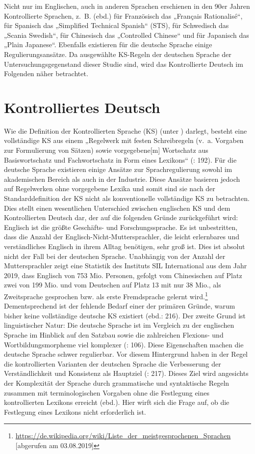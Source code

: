 Nicht nur im Englischen, auch in anderen Sprachen erschienen in den 90er Jahren Kontrollierte Sprachen, z.~B. (ebd.) für Französisch das „Français Rationalisé“, für Spanisch das „Simplified Technical Spanish“ (STS), für Schwedisch das „Scania Swedish“, für Chinesisch das „Controlled Chinese“ und für Japanisch das „Plain Japanese“. Ebenfalls existieren für die deutsche Sprache einige Regulierungsansätze. Da ausgewählte KS-Regeln der deutschen Sprache der Untersuchungsgegenstand dieser Studie sind, wird das Kontrollierte Deutsch im Folgenden näher betrachtet.

\section{\label{sec:2.3}Kontrolliertes Deutsch}

Wie die Definition der Kontrollierten Sprache (KS) (unter ) darlegt, besteht eine vollständige KS aus einem „Regelwerk mit festen Schreibregeln (v.~a. Vorgaben zur Formulierung von Sätzen) sowie vorgegebene[m] Wortschatz aus Basiswortschatz und Fachwortschatz in Form eines Lexikons“ (\citealt{DrewerZiegler2014}: 192). Für die deutsche Sprache existieren einige Ansätze zur Sprachregulierung sowohl im akademischen Bereich als auch in der Industrie. Diese Ansätze basieren jedoch auf Regelwerken ohne vorgegebene Lexika und somit sind sie nach der Standarddefinition der KS nicht als konventionelle vollständige KS zu betrachten. Dies stellt einen wesentlichen Unterschied zwischen englischen KS und dem Kontrollierten Deutsch dar, der auf die folgenden Gründe zurückgeführt wird: Englisch ist die größte Geschäfts- und Forschungssprache. Es ist unbestritten, dass die Anzahl der Englisch-Nicht-Muttersprachler, die leicht erlernbares und verständliches Englisch in ihrem Alltag benötigen, sehr groß ist. Dies ist absolut nicht der Fall bei der deutschen Sprache. Unabhängig von der Anzahl der Muttersprachler zeigt eine Statistik des Instituts SIL International aus dem Jahr 2019, dass Englisch von 753 Mio. Personen, gefolgt vom Chinesischen auf Platz zwei von 199 Mio. und vom Deutschen auf Platz 13 mit nur 38 Mio., als Zweitsprache gesprochen bzw. als erste Fremdsprache gelernt wird.\footnote{\url{https://de.wikipedia.org/wiki/Liste\_der\_meistgesprochenen\_Sprachen} [abgerufen am 03.08.2019]} Dementsprechend ist der fehlende Bedarf einer der primären Gründe, warum bisher keine vollständige deutsche KS existiert (ebd.: 216). Der zweite Grund ist linguistischer Natur: Die deutsche Sprache ist im Vergleich zu der englischen Sprache im Hinblick auf den Satzbau sowie die zahlreichen Flexions- und Wortbildungsmorpheme viel komplexer (\citealt{LehrndorferReuther2008}: 106). Diese Eigenschaften machen die deutsche Sprache schwer regulierbar. Vor diesem Hintergrund haben in der Regel die kontrollierten Varianten der deutschen Sprache die Verbesserung der Verständlichkeit und Konsistenz als Hauptziel (\citealt{DrewerZiegler2014}: 217). Dieses Ziel wird angesichts der Komplexität der Sprache durch grammatische und syntaktische Regeln zusammen mit terminologischen Vorgaben ohne die Festlegung eines kontrollierten Lexikons erreicht (ebd.). Hier wirft sich die Frage auf, ob die Festlegung eines Lexikons nicht erforderlich ist.

